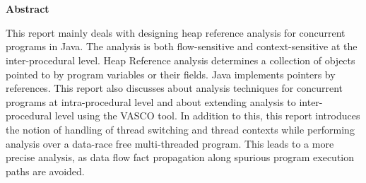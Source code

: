 \chapter*{}
\begin{center}
\textbf{Abstract}
\end{center}


This report mainly deals with designing heap reference analysis for concurrent programs in Java. The analysis is both flow-sensitive and context-sensitive at the inter-procedural level. Heap Reference analysis determines a collection of objects pointed to by program variables or their fields. Java implements pointers by references. This report also discusses about analysis techniques for concurrent programs at intra-procedural level and about extending analysis to inter-procedural level using the VASCO tool. In addition to this, this report introduces the notion of handling of thread switching and thread contexts while performing analysis over a data-race free multi-threaded program. This leads to a more precise analysis, as data flow fact propagation along spurious program execution paths are avoided.  

